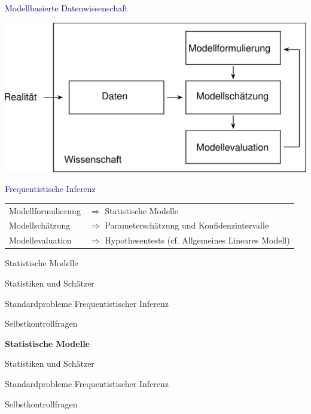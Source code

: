 \documentclass[
  8pt,
  ignorenonframetext,
]{beamer}
\begin{document}
\begin{frame}{}
\protect\hypertarget{section-3}{}
\textcolor{darkblue}{Modellbasierte Datenwissenschaft} \vspace{3mm}

\begin{center}\includegraphics[width=0.75\linewidth]{9_Abbildungen/wtfi_9_modellbasierte_datenwissenschaft} \end{center}

\textcolor{darkblue}{Frequentistische Inferenz} \small \vspace{3mm}
\center

\begin{tabular}{ll}
Modellformulierung & $\Rightarrow$ Statistische Modelle                                \\
Modellschätzung    & $\Rightarrow$ Parameterschätzung und Konfidenzintervalle          \\
Modellevaluation   & $\Rightarrow$ Hypothesentests (cf. Allgemeines Lineares Modell)
\end{tabular}
\end{frame}

\begin{frame}{}
\protect\hypertarget{section-4}{}
\large
{}
\vfill

Statistische Modelle

Statistiken und Schätzer

Standardprobleme Frequentistischer Inferenz

Selbstkontrollfragen \vfill
\end{frame}

\begin{frame}{}
\protect\hypertarget{section-5}{}
\large
{}
\vfill

\textbf{Statistische Modelle}

Statistiken und Schätzer

Standardprobleme Frequentistischer Inferenz

Selbstkontrollfragen \vfill
\end{frame}
\end{document}
